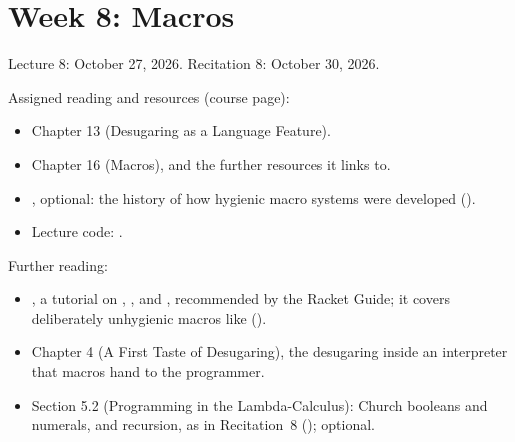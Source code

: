 \chapter{Week 8: Macros}
\label{ch:week8}

Lecture 8: October 27, 2026. Recitation 8: October 30, 2026.

Assigned reading and resources (course page):
\begin{itemize}
  \item \cite{PLAI} Chapter 13 (Desugaring as a Language Feature).
  \item \cite{RacketGuide} Chapter 16 (Macros), and the further resources it links to.
  \item \cite{ClingerWand}, optional: the history of how hygienic macro systems were developed ().
  \item Lecture code: .
\end{itemize}

Further reading:
\begin{itemize}
  \item \cite{FearOfMacros}, a tutorial on , , and , recommended by the Racket Guide; it covers deliberately unhygienic macros like  ().
  \item \cite{PLAI} Chapter 4 (A First Taste of Desugaring), the desugaring inside an interpreter that macros hand to the programmer.
  \item \cite{TAPL} Section 5.2 (Programming in the Lambda-Calculus): Church booleans and numerals, and recursion, as in Recitation~8 (); optional.
\end{itemize}

